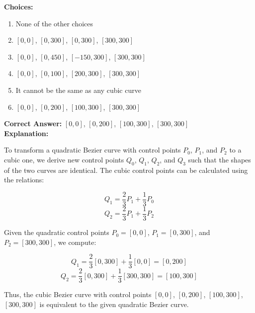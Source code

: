 \documentclass[notitlepage]{llncs}
\begin{document}
\textbf{Choices:}
\begin{enumerate}
\renewcommand{\labelenumi}{\Alph{enumi}.} 
    \item None of the other choices
    \item \([0, 0]\), \([0, 300]\), \([0, 300]\), \([300, 300]\) 
    \item \([0, 0]\), \([0, 450]\), \([-150, 300]\), \([300, 300]\) 
    \item \([0, 0]\), \([0, 100]\), \([200, 300]\), \([300, 300]\) 
    \item It cannot be the same as any cubic curve 
    \item \([0, 0]\), \([0, 200]\), \([100, 300]\), \([300, 300]\)
\end{enumerate}

\textbf{Correct Answer:} \([0, 0]\), \([0, 200]\), \([100, 300]\), \([300, 300]\)
\\

\textbf{Explanation:}

To transform a quadratic Bezier curve with control points \(P_0\), \(P_1\), and \(P_2\) to a cubic one, we derive new control points \(Q_0\), \(Q_1\), \(Q_2\), and \(Q_3\) such that the shapes of the two curves are identical. The cubic control points can be calculated using the relations:

\[ Q_1 = \frac{2}{3}P_1 + \frac{1}{3}P_0 \]
\[ Q_2 = \frac{2}{3}P_1 + \frac{1}{3}P_2 \]

Given the quadratic control points \(P_0 = [0, 0]\), \(P_1 = [0, 300]\), and \(P_2 = [300, 300]\), we compute:

\[ Q_1 = \frac{2}{3}[0, 300] + \frac{1}{3}[0, 0] = [0, 200] \]
\[ Q_2 = \frac{2}{3}[0, 300] + \frac{1}{3}[300, 300] = [100, 300] \]

Thus, the cubic Bezier curve with control points \([0, 0]\), \([0, 200]\), \([100, 300]\), \([300, 300]\) is equivalent to the given quadratic Bezier curve.
\end{document}
